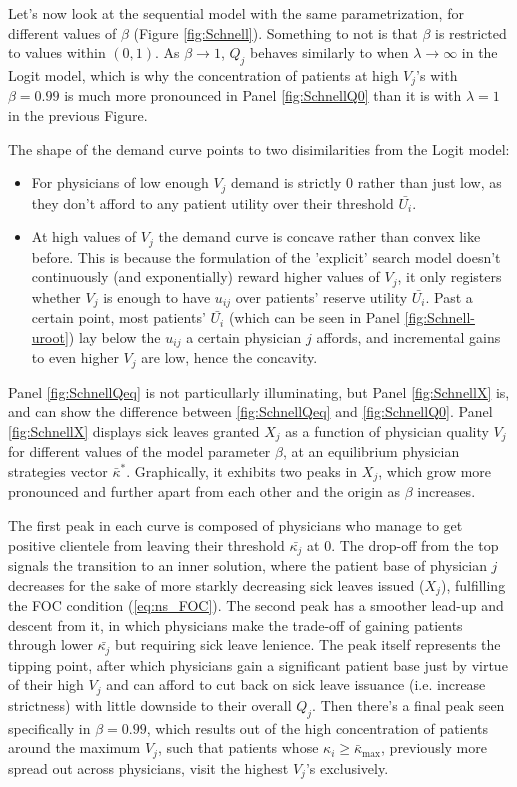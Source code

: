 \documentclass[../main.tex]{subfiles}
\begin{document}
Let's now look at the sequential model with the same parametrization, for different values of $\beta$ (Figure \ref{fig:Schnell}). Something to not is that $\beta$ is restricted to values within $(0,1)$. As $\beta \rightarrow 1$, $Q_j$ behaves similarly to when $\lambda \rightarrow \infty$ in the Logit model, which is why the concentration of patients at high $V_j$'s with $\beta = 0.99$ is much more pronounced in Panel \ref{fig:SchnellQ0} than it is with $\lambda = 1$ in the previous Figure.

The shape of the demand curve points to two disimilarities from the Logit model:
\begin{itemize}[itemsep=-1pt, topsep=0pt]
    \item For physicians of low enough $V_j$ demand is strictly 0 rather than just low, as they don't afford to any patient utility over their threshold $\bar{U_i}$.
    \item At high values of $V_j$ the demand curve is concave rather than convex like before. This is because the formulation of the 'explicit' search model doesn't continuously (and exponentially) reward higher values of $V_j$, it only registers whether $V_j$ is enough to have $u_{ij}$ over patients' reserve utility $\bar{U_i}$. Past a certain point, most patients' $\bar{U_i}$ (which can be seen in Panel \ref{fig:Schnell-uroot}) lay below the $u_{ij}$ a certain physician $j$ affords, and incremental gains to even higher $V_j$ are low, hence the concavity.
\end{itemize}

Panel \ref{fig:SchnellQeq} is not particullarly illuminating, but Panel \ref{fig:SchnellX} is, and can show the difference between \ref{fig:SchnellQeq} and \ref{fig:SchnellQ0}. Panel \ref{fig:SchnellX} displays sick leaves granted $X_j$ as a function of physician quality $V_j$ for different values of the model parameter $\beta$, at an equilibrium physician strategies vector $\bar{\kappa}^*$. Graphically, it exhibits two peaks in $X_j$, which grow more pronounced and further apart from each other and the origin as $\beta$ increases.

The first peak in each curve is composed of physicians who manage to get positive clientele from leaving their threshold $\bar{\kappa_j}$ at 0. The drop-off from the top signals the transition to an inner solution, where the patient base of physician $j$ decreases for the sake of more starkly decreasing sick leaves issued ($X_j$), fulfilling the FOC condition (\ref{eq:ns_FOC}). The second peak has a smoother lead-up and descent from it, in which physicians make the trade-off of gaining patients through lower $\bar{\kappa_j}$ but requiring sick leave lenience. The peak itself represents the tipping point, after which physicians gain a significant patient base just by virtue of their high $V_j$ and can afford to cut back on sick leave issuance (i.e. increase strictness) with little downside to their overall $Q_j$. Then there's a final peak seen specifically in $\beta = 0.99$, which results out of the high concentration of patients around the maximum $V_j$, such that patients whose $\kappa_i \geq \bar{\kappa}_{\max}$, previously more spread out across physicians, visit the highest $V_j$'s exclusively.
\end{document}
